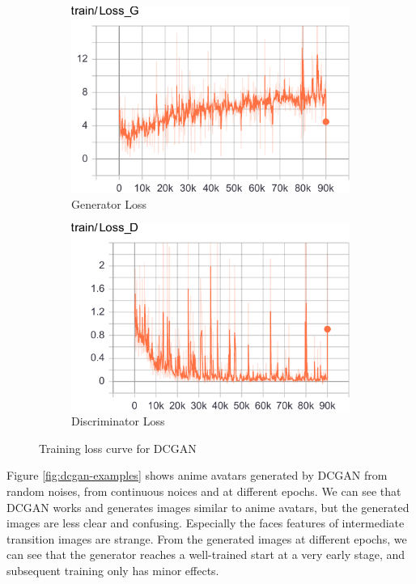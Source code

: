 \documentclass[10pt,twocolumn,letterpaper]{article}
\begin{document}
\begin{figure}[hb]
   \centering
   \begin{subfigure}{.48\linewidth}
      \centering
      \includegraphics[width=\linewidth]{dcgan-loss_g}
      \caption{Generator Loss}
   \end{subfigure}
   \begin{subfigure}{.48\linewidth}
      \centering
      \includegraphics[width=\linewidth]{dcgan-loss_d}
      \caption{Discriminator Loss}
   \end{subfigure}
   \caption{Training loss curve for DCGAN}
   \label{fig:dcgan-loss}
\end{figure}

Figure \ref{fig:dcgan-examples} shows anime avatars generated by DCGAN from
random noises, from continuous noices and at different epochs. We can see that
DCGAN works and generates images similar to anime avatars, but the generated
images are less clear and confusing. Especially the faces features of
intermediate transition images are strange. From the generated images at
different epochs, we can see that the generator reaches a well-trained start at
a very early stage, and subsequent training only has minor effects.
\end{document}
